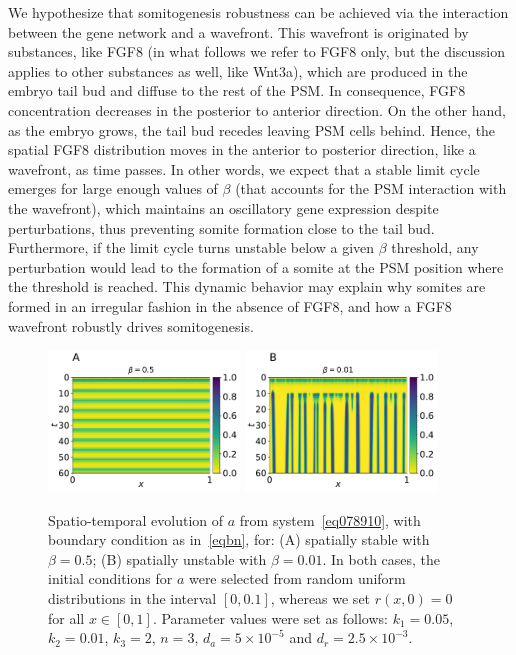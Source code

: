 \documentclass[11pt]{article}
\begin{document}
	We hypothesize that somitogenesis robustness can be achieved via the interaction
	between the gene network and a wavefront. This wavefront is originated by 
	substances, like FGF8 (in what follows we refer to FGF8 only, but the
	discussion applies to other substances as well, like Wnt3a), which are produced in the
	embryo tail bud and diffuse to the rest of the PSM. In consequence, FGF8
	concentration decreases in the posterior to anterior direction. On the other
	hand, as the embryo grows, the tail bud recedes leaving PSM cells behind. Hence,
	the spatial FGF8 distribution moves in the anterior to posterior direction, like
	a wavefront, as time passes. In other words, we expect that a stable limit cycle 
	emerges for large
	enough values of $\beta$ (that accounts for the PSM interaction with the
	wavefront), which maintains an oscillatory gene expression despite perturbations, 
	thus preventing somite formation close to the tail bud. Furthermore, if the limit
	cycle turns unstable below a given $\beta$ threshold, any perturbation would
	lead to the formation of a somite at the PSM position where the threshold is
	reached. This dynamic behavior may explain why somites are formed in an
	irregular fashion in the absence of FGF8, and how a FGF8 wavefront robustly
	drives somitogenesis.
	
	\begin{figure}[t!]
		\centering
		\includegraphics[width=2in]{Figures/Fig03aRev.pdf}
		\includegraphics[width=2in]{Figures/Fig03bRev.pdf}
		\caption{Spatio-temporal evolution of $a$ from system~\eqref{eq078910}, with
			boundary condition as in~\eqref{eqbn}, for: (A) spatially stable with
			$\beta=0.5$; (B) spatially unstable with $\beta=0.01$. In both cases, the
			initial conditions for $a$ were selected from random uniform distributions in
			the interval $[0, 0.1]$, whereas we set $r(x, 0) = 0$ for all $x\in[0,1]$.
			Parameter values were set as follows: $k_1=0.05$, $k_2=0.01$, $k_3=2$, $n=3$, $d_a =
			5\times10^{-5}$ and $d_r=2.5\times10^{-3}$.}
		\label{Fig03}
	\end{figure}
	
\end{document}
